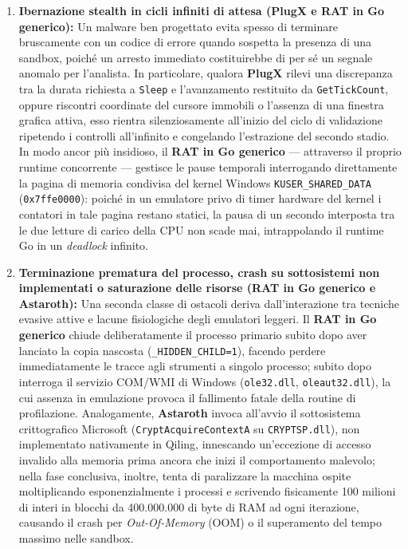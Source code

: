 \documentclass[11pt, a4paper]{article}
\begin{document}
\begin{enumerate}
	\item \textbf{Ibernazione stealth in cicli infiniti di attesa (PlugX e RAT in Go generico):} Un malware ben progettato evita spesso di terminare bruscamente con un codice di errore quando sospetta la presenza di una sandbox, poich\'e un arresto immediato costituirebbe di per s\'e un segnale anomalo per l'analista. In particolare, qualora \textbf{PlugX} rilevi una discrepanza tra la durata richiesta a \texttt{Sleep} e l'avanzamento restituito da \texttt{GetTickCount}, oppure riscontri coordinate del cursore immobili o l'assenza di una finestra grafica attiva, esso rientra silenziosamente all'inizio del ciclo di validazione ripetendo i controlli all'infinito e congelando l'estrazione del secondo stadio. In modo ancor pi\`u insidioso, il \textbf{RAT in Go generico} --- attraverso il proprio runtime concorrente --- gestisce le pause temporali interrogando direttamente la pagina di memoria condivisa del kernel Windows \texttt{KUSER\_\allowbreak{}SHARED\_\allowbreak{}DATA} (\texttt{0x7ffe0000}): poich\'e in un emulatore privo di timer hardware del kernel i contatori in tale pagina restano statici, la pausa di un secondo interposta tra le due letture di carico della CPU non scade mai, intrappolando il runtime Go in un \textit{deadlock} infinito.
	
	\item \textbf{Terminazione prematura del processo, crash su sottosistemi non implementati o saturazione delle risorse (RAT in Go generico e Astaroth):} Una seconda classe di ostacoli deriva dall'interazione tra tecniche evasive attive e lacune fisiologiche degli emulatori leggeri. Il \textbf{RAT in Go generico} chiude deliberatamente il processo primario subito dopo aver lanciato la copia nascosta (\texttt{\_\allowbreak{}HIDDEN\_\allowbreak{}CHILD=1}), facendo perdere immediatamente le tracce agli strumenti a singolo processo; subito dopo interroga il servizio COM/WMI di Windows (\texttt{ole32.dll}, \texttt{oleaut32.dll}), la cui assenza in emulazione provoca il fallimento fatale della routine di profilazione. Analogamente, \textbf{Astaroth} invoca all'avvio il sottosistema crittografico Microsoft (\texttt{Crypt\allowbreak{}Acquire\allowbreak{}ContextA} su \texttt{CRYPTSP.dll}), non implementato nativamente in Qiling, innescando un'eccezione di accesso invalido alla memoria prima ancora che inizi il comportamento malevolo; nella fase conclusiva, inoltre, tenta di paralizzare la macchina ospite moltiplicando esponenzialmente i processi e scrivendo fisicamente 100 milioni di interi in blocchi da 400.000.000 di byte di RAM ad ogni iterazione, causando il crash per \textit{Out-Of-Memory} (OOM) o il superamento del tempo massimo nelle sandbox.
	

\end{enumerate}
\end{document}

